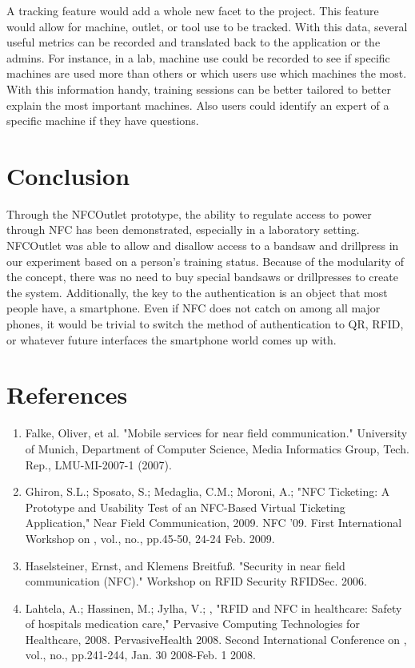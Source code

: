 \documentclass{sigchi}
\begin{document}
A tracking feature would add a whole new facet to the project. This feature would allow for machine, outlet, or tool use to be tracked. With this data, several useful metrics can be recorded and translated back to the application or the admins. For instance, in a lab, machine use could be recorded to see if specific machines are used more than others or which users use which machines the most. With this information handy, training sessions can be better tailored to better explain the most important machines.  Also users could identify an expert of a specific machine if they have questions.
\section{Conclusion}
Through the NFCOutlet prototype, the ability to regulate access to power through NFC has been demonstrated, especially in a laboratory setting. NFCOutlet was able to allow and disallow access to a bandsaw and drillpress in our experiment based on a person’s training status. Because of the modularity of the concept, there was no need to buy special bandsaws or drillpresses to create the system. Additionally, the key to the authentication is an object that most people have, a smartphone. Even if NFC does not catch on among all major phones, it would be trivial to switch the method of authentication to QR, RFID, or whatever future interfaces the smartphone world comes up with. 

\section{References}

\begin{enumerate}
\item Falke, Oliver, et al. "Mobile services for near field communication." University of Munich, Department of Computer Science, Media Informatics Group, Tech. Rep., LMU-MI-2007-1 (2007).

\item Ghiron, S.L.; Sposato, S.; Medaglia, C.M.; Moroni, A.; "NFC Ticketing: A Prototype and Usability Test of an NFC-Based Virtual Ticketing Application," Near Field Communication, 2009. NFC '09. First International Workshop on , vol., no., pp.45-50, 24-24 Feb. 2009.

\item Haselsteiner, Ernst, and Klemens Breitfuß. "Security in near field communication (NFC)." Workshop on RFID Security RFIDSec. 2006.

\item Lahtela, A.; Hassinen, M.; Jylha, V.; , "RFID and NFC in healthcare: Safety of hospitals medication care," Pervasive Computing Technologies for Healthcare, 2008. PervasiveHealth 2008. Second International Conference on , vol., no., pp.241-244, Jan. 30 2008-Feb. 1 2008.
\end{enumerate}
\end{document}

